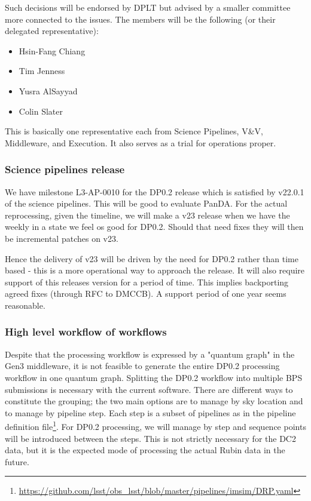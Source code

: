 Such decisions will be endorsed by DPLT but advised by a smaller committee more connected to the issues.
The members will be the following (or their delegated representative):

\begin{itemize}
\item Hsin-Fang Chiang
\item Tim Jenness
\item Yusra AlSayyad
\item Colin Slater
\end{itemize}

This is basically  one representative each from Science Pipelines, V\&V, Middleware, and Execution.
It also serves as a trial for operations proper.

\subsubsection {Science pipelines release} \label{sec:release}
We have milestone L3-AP-0010  for the DP0.2 release which is satisfied by v22.0.1 of the science pipelines. This will be good to evaluate PanDA.
For the actual reprocessing, given the timeline, we will make a v23 release when we have the weekly in a state we feel os good for DP0.2.
Should that need fixes they will then be incremental patches on v23.

Hence the delivery of v23  will be driven by the need for DP0.2 rather than time based - this is a more operational way to approach the release.
It will also require support of this releases version for a period of time. This implies backporting agreed fixes (through RFC to DMCCB). A support period of one year seems reasonable.

\subsubsection {High level workflow of workflows}
Despite that the processing workflow is expressed by a "quantum graph" in the Gen3 middleware, it is not feasible to generate the entire DP0.2 processing workflow in one quantum graph.
Splitting the DP0.2 workflow into multiple BPS submissions is necessary with the current software.
There are different ways to constitute the grouping; the two main options are to manage by sky location and to manage by pipeline step.
Each step is a subset of pipelines as in the pipeline definition file\footnote{\url{https://github.com/lsst/obs_lsst/blob/master/pipelines/imsim/DRP.yaml}}.
For DP0.2 processing, we will manage by step and sequence points will be introduced between the steps.
This is not strictly necessary for the DC2 data, but it is the expected mode of processing the actual Rubin data in the future.

